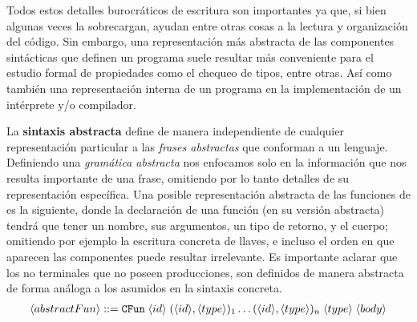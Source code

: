 Todos estos detalles burocráticos de escritura son importantes ya que, si bien algunas veces la sobrecargan, ayudan entre otras cosas a la lectura y organización del código.
Sin embargo, una representación más abstracta de las componentes sintácticas que definen un programa suele resultar más conveniente para el estudio formal de propiedades como el chequeo de tipos, entre otras.
Así como también una representación interna de un programa en la implementación de un intérprete y/o compilador.

La \textbf{sintaxis abstracta} define de manera independiente de cualquier representación particular a las \textit{frases abstractas} que conforman a un lenguaje.
Definiendo una \textit{gramática abstracta} nos enfocamos solo en la información que nos resulta importante de una frase, omitiendo por lo tanto detalles de su representación específica.
Una posible representación abstracta de las funciones de \C{} es la siguiente, donde la declaración de una función (en su versión abstracta) tendrá que tener un nombre, sus argumentos, un tipo de retorno, y el cuerpo; omitiendo por ejemplo la escritura concreta de llaves, e incluso el orden en que aparecen las componentes puede resultar irrelevante.
Es importante aclarar que los no terminales que no poseen producciones, son definidos de manera abstracta de forma análoga a los asumidos en la sintaxis concreta.
\begin{gather*}
\langle abstractFun \rangle ::= \texttt{CFun} \; \langle id \rangle \; ( \langle id \rangle, \langle type \rangle )_1 \ldots ( \langle id \rangle, \langle type \rangle )_n \; \langle type \rangle \; \langle body \rangle
\end{gather*}

